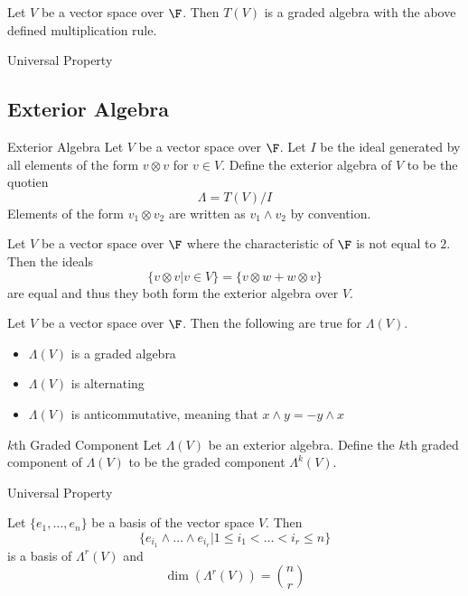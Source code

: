 \documentclass[a4paper]{article}
\begin{document}
\begin{prp}{}{} Let $V$ be a vector space over $\F$. Then $T(V)$ is a graded algebra with the above defined multiplication rule. 
\end{prp}

\begin{prp}{Universal Property}{}
\end{prp}

\subsection{Exterior Algebra}
\begin{defn}{Exterior Algebra}{} Let $V$ be a vector space over $\F$. Let $I$ be the ideal generated by all elements of the form $v\otimes v$ for $v\in V$. Define the exterior algebra of $V$ to be the quotien $$\Lambda=T(V)/I$$ Elements of the form $v_1\otimes v_2$ are written as $v_1\wedge v_2$ by convention. 
\end{defn}

\begin{lmm}{}{} Let $V$ be a vector space over $\F$ where the characteristic of $\F$ is not equal to $2$. Then the ideals $$\{v\otimes v|v\in V\}=\{v\otimes w+w\otimes v\}$$ are equal and thus they both form the exterior algebra over $V$. 
\end{lmm}

\begin{prp}{}{} Let $V$ be a vector space over $\F$. Then the following are true for $\Lambda(V)$. 
\begin{itemize}
\item $\Lambda(V)$ is a graded algebra
\item $\Lambda(V)$ is alternating
\item $\Lambda(V)$ is anticommutative, meaning that $x\wedge y=-y\wedge x$
\end{itemize}
\end{prp}

\begin{defn}{$k$th Graded Component}{} Let $\Lambda(V)$ be an exterior algebra. Define the $k$th graded component of $\Lambda(V)$ to be the graded component $\Lambda^k(V)$. 
\end{defn}

\begin{prp}{Universal Property}{}
\end{prp}

\begin{prp}{}{} Let $\{e_1,\dots,e_n\}$ be a basis of the vector space $V$. Then $$\{e_{i_1}\wedge\dots\wedge e_{i_r}|1\leq i_1<\dots<i_r\leq n\}$$ is a basis of $\Lambda^r(V)$ and $$\dim(\Lambda^r(V))=\binom{n}{r}$$
\end{prp}
\end{document}
